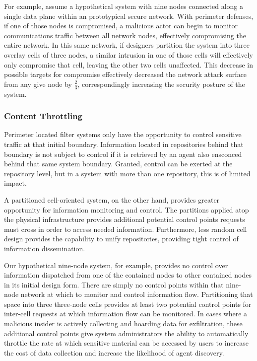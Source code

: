 For example, assume a hypothetical system with nine nodes connected along a single data plane within an prototypical secure network.  With perimeter defenses, if one of those nodes is compromised, a malicious actor can begin to monitor communications traffic between all network nodes, effectively compromising the entire network.  In this same network, if designers partition the system into three overlay cells of three nodes, a similar intrusion in one of those cells will effectively only compromise that cell, leaving the other two cells unaffected.  This decrease in possible targets for compromise effectively decreased the network attack surface from any give node by $\frac{2}{3}$, correspondingly increasing the security posture of the system.

\subsubsection*{Content Throttling}
Perimeter located filter systems only have the opportunity to control sensitive traffic at that initial boundary.  Information located in repositories behind that boundary is not subject to control if it is retrieved by an agent also ensconced behind that same system boundary.  Granted, control can be exerted at the repository level, but in a system with more than one repository, this is of limited impact.

A partitioned cell-oriented system, on the other hand, provides greater opportunity for information monitoring and control.  The partitions applied atop the physical infrastructure provides additional potential control points requests must cross in order to access needed information.  Furthermore, less random cell design provides the capability to unify repositories, providing tight control of information dissemination.

Our hypothetical nine-node system, for example, provides no control over information dispatched from one of the contained nodes to other contained nodes in its initial design form.  There are simply no control points within that nine-node network at which to monitor and control information flow.  Partitioning that space into three three-node cells provides at least two potential control points for inter-cell requests at which information flow can be monitored.  In cases where a malicious insider is actively collecting and hoarding data for exfiltration, these additional control points give system administrators the ability to automatically throttle the rate at which sensitive material can be accessed by users to increase the cost of data collection and increase the likelihood of agent discovery.

